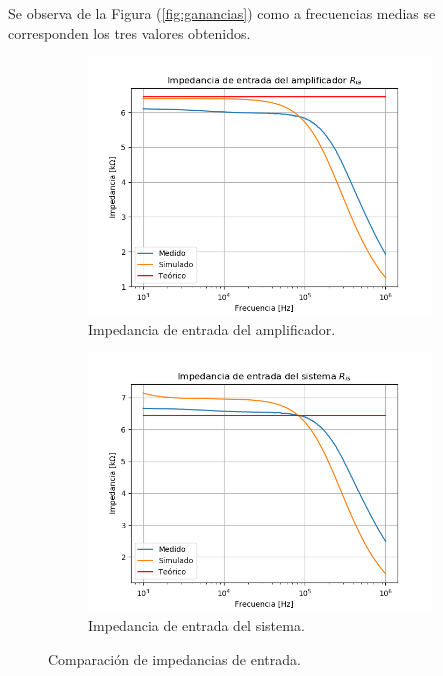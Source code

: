 Se observa de la Figura (\ref{fig:ganancias}) como a frecuencias medias se corresponden los tres valores obtenidos. 
\begin{figure}[H]
\centering
\begin{subfigure}{.49\textwidth}
\centering
	\includegraphics[width=\textwidth]{Imagenes/Ria.png}
	\caption{Impedancia de entrada del amplificador.}
	\label{fig:ria}
\end{subfigure}
\begin{subfigure}{.49\textwidth}
\centering
	\includegraphics[width=\textwidth]{Imagenes/Ris.png}
	\caption{Impedancia de entrada del sistema.}
	\label{fig:ris}
\end{subfigure}
\caption{Comparación de impedancias de entrada.}
\label{fig:ri}
\end{figure}
